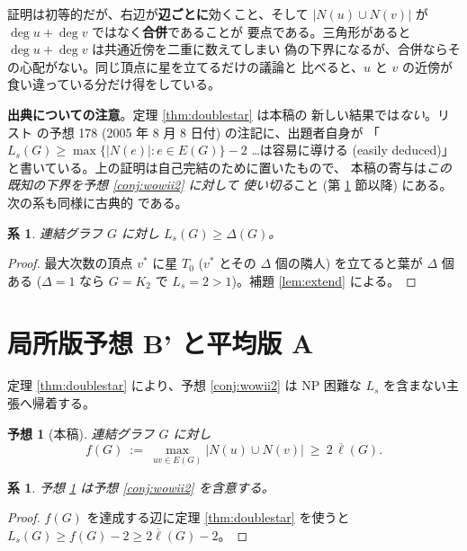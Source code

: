 \documentclass[paper=a4,fontsize=10.5pt,jafontsize=10.5pt]{jlreq}
\theoremstyle{plain}
\newtheorem{corollary}[theorem]{系}
\newtheorem{conjecture}[theorem]{予想}
\theoremstyle{definition}
\begin{document}
証明は初等的だが、右辺が\textbf{辺ごとに}効くこと、そして
$|N(u) \cup N(v)|$ が $\deg u + \deg v$ ではなく\textbf{合併}であることが
要点である。三角形があると $\deg u + \deg v$ は共通近傍を二重に数えてしまい
偽の下界になるが、合併ならその心配がない。同じ頂点に星を立てるだけの議論と
比べると、$u$ と $v$ の近傍が食い違っている分だけ得をしている。

\medskip
\noindent\textbf{出典についての注意}。定理 \ref{thm:doublestar} は本稿の
新しい結果では\emph{ない}。リスト \cite{wowii} の予想 178 (2005 年 8 月
8 日付) の注記に、出題者自身が
「$L_s(G) \ge \max\{|N(e)| : e \in E(G)\} - 2$ …は容易に導ける
(easily deduced)」と書いている。上の証明は自己完結のために置いたもので、
本稿の寄与は\emph{この既知の下界を予想 \ref{conj:wowii2} に対して
使い切る}こと (第 \ref{sec:bprime} 節以降) にある。次の系も同様に古典的
である。

\begin{corollary}\label{cor:delta}
連結グラフ $G$ に対し $L_s(G) \ge \Delta(G)$。
\end{corollary}

\begin{proof}
最大次数の頂点 $v^*$ に星 $T_0$ ($v^*$ とその $\Delta$ 個の隣人) を立てると葉が
$\Delta$ 個ある ($\Delta = 1$ なら $G = K_2$ で $L_s = 2 > 1$)。補題
\ref{lem:extend} による。
\end{proof}

\section{局所版予想 B' と平均版 A}\label{sec:bprime}

定理 \ref{thm:doublestar} により、予想 \ref{conj:wowii2} は NP 困難な
$L_s$ を含まない主張へ帰着する。

\begin{conjecture}[本稿]\label{conj:bprime}
連結グラフ $G$ に対し
\[ f(G) \ := \ \max_{uv \in E(G)} |N(u) \cup N(v)|
   \ \ge \ 2\,\overline{\ell}(G) . \]
\end{conjecture}

\begin{corollary}\label{cor:bprime}
予想 \ref{conj:bprime} は予想 \ref{conj:wowii2} を含意する。
\end{corollary}

\begin{proof}
$f(G)$ を達成する辺に定理 \ref{thm:doublestar} を使うと
$L_s(G) \ge f(G) - 2 \ge 2\overline{\ell}(G) - 2$。
\end{proof}
\end{document}
